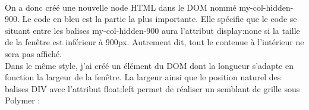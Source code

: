 \documentclass{article}
\begin{document}
\vspace{0.5cm}\\
On a donc cr\'e\'e une nouvelle node HTML dans le DOM nomm\'e my-col-hidden-900. Le code en bleu est la partie la plus importante. Elle sp\'ecifie que le code se situant entre les balises \og my-col-hidden-900 \fg{} aura l'attribut \og display:none \fg{} si la taille de la fen\^etre est inf\'erieur \`a 900px. Autrement dit, tout le contenue \`a l'int\'erieur ne sera pas affich\'e.\\
Dans le m\^eme style, j'ai cr\'e\'e un \'el\'ement du DOM dont la longueur s'adapte en fonction la largeur de la fen\^etre. La largeur ainsi que le position naturel des balises DIV avec l'attribut \og float:left \fg{} permet de r\'ealiser un semblant de grille sous Polymer :
\vspace{0.5cm}\\
\\
\end{document}
